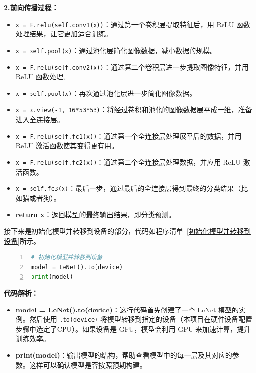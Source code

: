 \textbf{2.前向传播过程：}
\begin{itemize}
    \item \texttt{x = F.relu(self.conv1(x))}：通过第一个卷积层提取特征后，用 ReLU 函数处理结果，让它更加适合训练。
    \item \texttt{x = self.pool(x)}：通过池化层简化图像数据，减小数据的规模。
    \item \texttt{x = F.relu(self.conv2(x))}：通过第二个卷积层进一步提取图像特征，并用 ReLU 函数处理。
    \item \texttt{x = self.pool(x)}：再次通过池化层进一步简化图像数据。
    \item \texttt{x = x.view(-1, 16*53*53)}：将经过卷积和池化的图像数据展平成一维，准备进入全连接层。
    \item \texttt{x = F.relu(self.fc1(x))}：通过第一个全连接层处理展平后的数据，并用 ReLU 激活函数使其变得更有用。
    \item \texttt{x = F.relu(self.fc2(x))}：通过第二个全连接层处理数据，并应用 ReLU 激活函数。
    \item \texttt{x = self.fc3(x)}：最后一步，通过最后的全连接层得到最终的分类结果（比如猫或者狗）。
    \item \textbf{return x}：返回模型的最终输出结果，即分类预测。
\end{itemize}

    



接下来是初始化模型并转移到设备的部分，代码如程序清单~\ref{初始化模型并转移到设备}所示。
\begin{lstlisting}[language={python},label={初始化模型并转移到设备},caption={初始化模型并转移到设备}, basicstyle=\footnotesize\ttfamily, breaklines=true, numbers=left, frame=single,keepspaces=true,showstringspaces=false]
# 初始化模型并转移到设备
model = LeNet().to(device)
print(model)
\end{lstlisting}
\textbf{代码解析：}
\begin{itemize}
    \item \textbf{model = LeNet().to(device)}：这行代码首先创建了一个 LeNet 模型的实例。然后使用 \texttt{.to(device)} 将模型转移到指定的设备（本项目在硬件设备配置步骤中选定了CPU）。如果设备是 GPU，模型会利用 GPU 来加速计算，提升训练效率。
    
    \item \textbf{print(model)}：输出模型的结构，帮助查看模型中的每一层及其对应的参数。这样可以确认模型是否按照预期构建。
\end{itemize}

